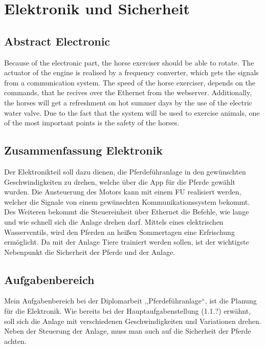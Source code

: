 \chapter{Elektronik und Sicherheit}
\label{sec:elektronikUndSicherheit}

\section{Abstract Electronic}
\label{sec:abstractETE}

Because of the electronic part, the horse exerciser should be able to rotate. 
The actuator of the engine is realised by a frequency converter, which gets the signals from a communication system.
The speed of the horse exerciser, depends on the commands, that he recives over the Ethernet from the webserver.
Additionally, the horses will get a refreshment on hot summer days by the use of the electric water valve.
Due to the fact that the system will be used to exercise animals, one of the most important points is the safety of the horses.

\section{Zusammenfassung Elektronik}
\label{sec:zusammenfassungElektronik}

Der Elektronikteil soll dazu dienen, die Pferdeführanlage in den gewünschten Geschwindigkeiten zu drehen, welche über die App für die Pferde gewählt wurden. 
Die Ansteuerung des Motors kann mit einem \ac{FU} realisiert werden, 
welcher die Signale von einem gewünschten Kommunikationssystem bekommt.
Des Weiteren bekommt die Steuereinheit über Ethernet die Befehle, wie lange und wie schnell sich die Anlage drehen darf.
Mittels eines elektrischen Wasserventils, wird den Pferden an heißen Sommertagen eine Erfrischung ermöglicht. 
Da mit der Anlage Tiere trainiert werden sollen, ist der wichtigste Nebenpunkt die Sicherheit der Pferde und der Anlage.
\newpage

\section{Aufgabenbereich}
\label{sec:aufgabenbereich}

Mein Aufgabenbereich bei der Diplomarbeit ,,Pferdeführanlage“, ist die Planung für die Elektronik. Wie bereits bei der Hauptaufgabenstellung (1.1.?) erwähnt, 
soll sich die Anlage mit verschiedenen Geschwindigkeiten und Variationen drehen.  Neben der Steuerung der Anlage, muss man auch auf die Sicherheit der Pferde achten.
\newline{}

